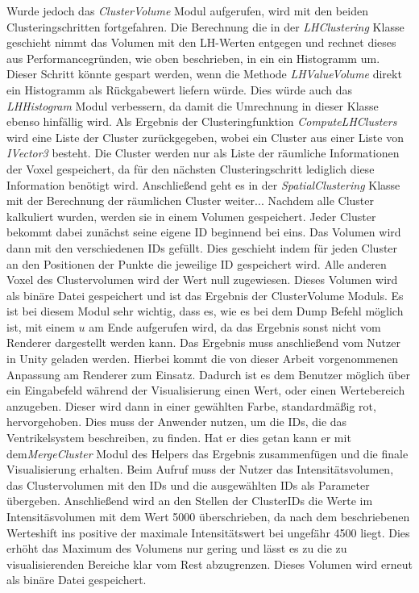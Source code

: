 \newline
Wurde jedoch das \textit{ClusterVolume} Modul aufgerufen, wird mit den beiden Clusteringschritten fortgefahren.
Die Berechnung die in der \textit{LHClustering} Klasse geschieht nimmt das Volumen mit den LH-Werten entgegen und rechnet dieses aus Performancegründen, wie oben beschrieben, in ein ein Histogramm um. Dieser Schritt könnte gespart werden, wenn die Methode \textit{LHValueVolume} direkt ein Histogramm als Rückgabewert liefern würde. Dies würde auch das \textit{LHHistogram} Modul verbessern, da damit die Umrechnung in dieser Klasse ebenso hinfällig wird. Als Ergebnis der Clusteringfunktion \textit{ComputeLHClusters} wird eine Liste der Cluster zurückgegeben, wobei ein Cluster aus einer Liste von \textit{IVector3} besteht. Die Cluster werden nur als Liste der räumliche Informationen der Voxel gespeichert, da für den nächsten Clusteringschritt  lediglich diese Information benötigt wird. 
\newline
Anschließend geht es in der \textit{SpatialClustering} Klasse mit der Berechnung der räumlichen Cluster weiter...
\newline
Nachdem alle Cluster kalkuliert wurden, werden sie in einem Volumen gespeichert. Jeder Cluster bekommt dabei zunächst seine eigene ID beginnend bei eins. Das Volumen wird dann mit den verschiedenen IDs gefüllt. Dies geschieht indem für jeden Cluster an den Positionen der Punkte die jeweilige ID gespeichert wird. Alle anderen Voxel des Clustervolumen wird der Wert null zugewiesen. Dieses Volumen wird als binäre Datei gespeichert und ist das Ergebnis der ClusterVolume Moduls. Es ist bei diesem Modul sehr wichtig, dass es, wie es bei dem Dump Befehl möglich ist, mit einem $u$ am Ende aufgerufen wird, da das Ergebnis sonst nicht vom Renderer dargestellt werden kann.
\newline
Das Ergebnis muss anschließend vom Nutzer in Unity geladen werden. Hierbei kommt die von dieser Arbeit vorgenommenen Anpassung am Renderer zum Einsatz. Dadurch ist es dem Benutzer möglich über ein Eingabefeld während der Visualisierung einen Wert, oder einen Wertebereich anzugeben. Dieser wird dann in einer gewählten Farbe, standardmäßig rot, hervorgehoben. Dies muss der Anwender nutzen, um die IDs, die das Ventrikelsystem beschreiben, zu finden.
\newline
Hat er dies getan kann er mit dem\textit{MergeCluster} Modul des Helpers das Ergebnis zusammenfügen und die finale Visualisierung erhalten. Beim Aufruf muss der Nutzer das Intensitätsvolumen, das Clustervolumen mit den IDs und die ausgewählten IDs als Parameter übergeben. Anschließend wird an den Stellen der ClusterIDs die Werte im Intensitäsvolumen mit dem Wert 5000 überschrieben, da nach dem beschriebenen Werteshift ins positive der maximale Intensitätswert bei ungefähr 4500 liegt. Dies erhöht das Maximum des Volumens nur gering und lässt es zu die zu visualisierenden Bereiche klar vom Rest abzugrenzen. Dieses Volumen wird erneut als binäre Datei gespeichert.

